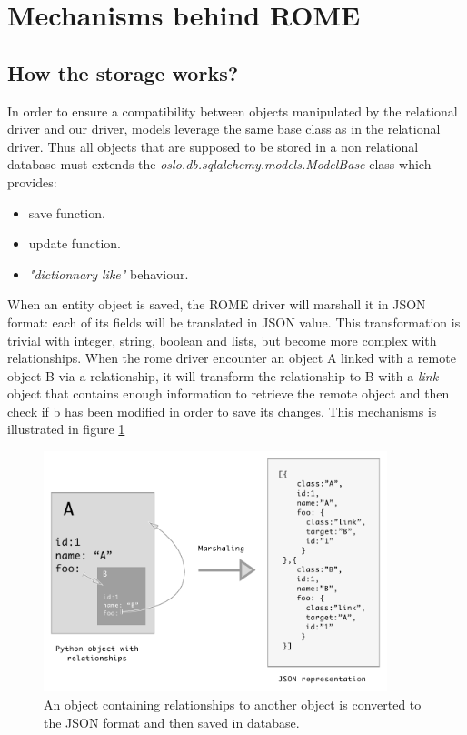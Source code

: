 \section{Mechanisms behind ROME}

\subsection{How the storage works?}

In order to ensure a compatibility between objects manipulated by the relational
driver and our driver, models leverage the same base class as in the relational
driver. Thus all objects that are supposed to be stored in a non relational
database must extends the \emph{oslo.db.sqlalchemy.models.ModelBase} class which
provides:

\begin{itemize}
\item save function.
\item update function.
\item \emph{"dictionnary like"} behaviour.
\end{itemize}

When an entity object is saved, the ROME driver will marshall it in JSON format:
each of its fields will be translated in JSON value. This transformation is
trivial with integer, string, boolean and lists, but become more complex with
relationships. When the rome driver encounter an object A linked with a remote
object B via a relationship, it will transform the relationship to B with a
\emph{link} object that contains enough information to retrieve the remote
object and then check if b has been modified in order to save its changes. This
mechanisms is illustrated in figure \ref{fig:rome_marshalling}

\begin{figure}[h!]
        \centering
        \includegraphics[width=10cm]{figures/rome_marshaling.pdf}
        \caption{An object containing relationships to another object is
        converted to the JSON format and then saved in database.}
      \label{fig:rome_marshalling}
\vspace*{-.3cm}
\end{figure}

